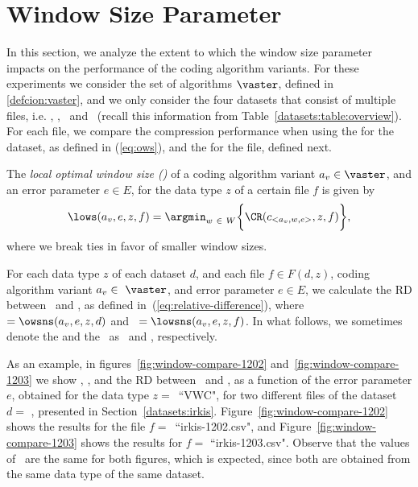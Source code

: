 
\clearpage
\section{Window Size Parameter}
\label{secX:windows}


In this section, we analyze the extent to which the window size parameter impacts on the performance of the coding algorithm variants. For these experiments we consider the set of algorithms $\vaster$, defined in \ref{defcion:vaster}, and we only consider the four datasets that consist of multiple files, i.e. \datasetirkis, \datasetsst, \datasetadcp \ and \datasetsolar\ (recall this information from Table~\ref{datasets:table:overview}). For each file, we compare the compression performance when using the \ows for the dataset, as defined in (\ref{eq:ows}), and the \lows for the file, defined next.


\begin{defcion}
The \textit{local optimal window size (\lowsit)} of a coding algorithm variant $a_v \in \vaster$, and an error parameter $e \in E$, for the data type $z$ of a certain file $f$ is given by
\begin{equation}
\lows(a_v, e, z, f) = \argmin_{w\ \in \ W} \biggl\{ \CR(c_{<a_v, w, e>}, z, f) \biggr\},
\end{equation}
where we break ties in favor of smaller window sizes.
\end{defcion}


For each data type $z$ of each dataset $d$, and each file $f \in F(d, z)$, coding algorithm variant $a_v \in~\vaster$, and error parameter $e \in E$, we calculate the RD between \globalCAI\ and \localCAI, as defined in~(\ref{eq:relative-difference}), where \WGlobal\ $=\owsns(a_v, e, z, d)$ and \WLocal\ $=\lowsns(a_v, e, z, f)$. In what follows, we sometimes denote the \ows and the \lows\ as \WGlobal\ and \WLocal, respectively.


\newcommand{\fileIrkisOne}{irkis-1202.csv}
\newcommand{\fileIrkisTwo}{irkis-1203.csv}


As an example, in figures~\ref{fig:window-compare-1202} and~\ref{fig:window-compare-1203} we show \WGlobal, \WLocal, and the RD between \globalCAI\ and \localCAI, as a function of the error parameter $e$, obtained for the data type $z=$~``VWC", for two different files of the dataset $d=$ \datasetirkis, presented in Section~\ref{datasets:irkis}. Figure~\ref{fig:window-compare-1202} shows the results for the file $f=$~``\fileIrkisOne", and Figure~\ref{fig:window-compare-1203} shows the results for $f=$ ``\fileIrkisTwo". Observe that the values of \WGlobal\ are the same for both figures, which is expected, since both are obtained from the same data type of the same dataset.


